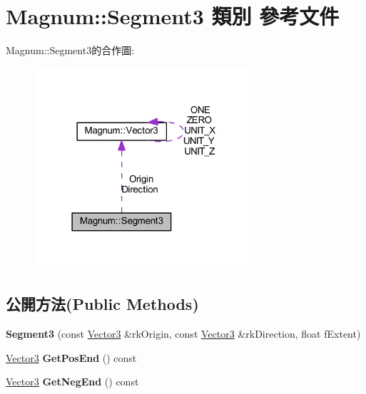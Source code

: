 \hypertarget{class_magnum_1_1_segment3}{}\section{Magnum\+:\+:Segment3 類別 參考文件}
\label{class_magnum_1_1_segment3}


Magnum\+:\+:Segment3的合作圖\+:\nopagebreak
\begin{figure}[H]
\begin{center}
\leavevmode
\includegraphics[width=231pt]{class_magnum_1_1_segment3__coll__graph}
\end{center}
\end{figure}
\subsection*{公開方法(Public Methods)}
\begin{DoxyCompactItemize}
\item 
{\bfseries Segment3} (const \hyperlink{class_magnum_1_1_vector3}{Vector3} \&rk\+Origin, const \hyperlink{class_magnum_1_1_vector3}{Vector3} \&rk\+Direction, float f\+Extent)\hypertarget{class_magnum_1_1_segment3_a92573e18cb808aa83e5751d8fdb50a5c}{}\label{class_magnum_1_1_segment3_a92573e18cb808aa83e5751d8fdb50a5c}

\item 
\hyperlink{class_magnum_1_1_vector3}{Vector3} {\bfseries Get\+Pos\+End} () const \hypertarget{class_magnum_1_1_segment3_a8a28c9de603d14eb95a16ca69a80e63c}{}\label{class_magnum_1_1_segment3_a8a28c9de603d14eb95a16ca69a80e63c}

\item 
\hyperlink{class_magnum_1_1_vector3}{Vector3} {\bfseries Get\+Neg\+End} () const \hypertarget{class_magnum_1_1_segment3_ae756550fdf6407db62bb77564a2a8941}{}\label{class_magnum_1_1_segment3_ae756550fdf6407db62bb77564a2a8941}

\end{DoxyCompactItemize}
